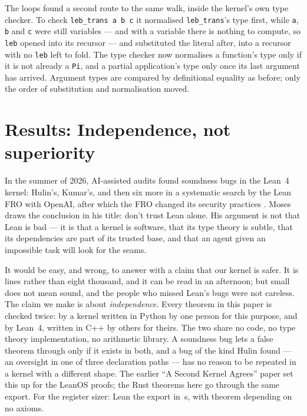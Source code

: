 \documentclass[11pt]{article}
\begin{document}
The loops found a second route to the same walk, inside the kernel's own
type checker.  To check \texttt{leb\_trans a b c} it normalised
\texttt{leb\_trans}'s type first, while \texttt{a}, \texttt{b} and
\texttt{c} were still variables --- and with a variable there is nothing to
compute, so \texttt{leb} opened into its recursor --- and substituted the
literal after, into a recursor with no \texttt{leb} left to fold.  The
type checker now normalises a function's type only if it is not already a
\texttt{Pi}, and a partial application's type only once its last argument
has arrived.  Argument types are compared by definitional equality as
before; only the order of substitution and normalisation moved.

\section{Results: Independence, not superiority}
\label{sec:two}

In the summer of 2026, AI-assisted audits found soundness bugs in the Lean~4
kernel: Hulin's, Kumar's, and then six more in a systematic search by the
Lean FRO with OpenAI, after which the FRO changed its security practices
\cite{moses2026,reddit2026}.  Moses draws the conclusion in his title:
don't trust Lean alone.  His argument is not that Lean is bad --- it is that
a kernel is software, that its type theory is subtle, that its dependencies
are part of its trusted base, and that an agent given an impossible task
will look for the seams.

It would be easy, and wrong, to answer with a claim that our kernel is safer.
It is  lines rather than eight thousand, and it can be read in
an afternoon; but small does not mean sound, and the people who missed Lean's
bugs were not careless.  The claim we make is about \emph{independence}.
Every theorem in this paper is checked twice: by a kernel written in Python
by one person for this purpose, and by Lean~4, written in C++ by others for
theirs.  The two share no code, no type theory implementation, no
arithmetic library.  A soundness bug lets a false theorem through only if it
exists in both, and a bug of the kind Hulin found --- an oversight in one
of three declaration paths --- has no reason to be repeated in a kernel
with a different shape.  The earlier ``A Second Kernel Agrees'' paper
\cite{hartshorn2026second} set this up for the LeanOS proofs; the Rust
theorems here go through the same export.  For the register sizer: Lean
\leanVersion{} \regsLeanVerdict{} the export in \regsLeanSeconds{}\,s, with
\regsLeanNoAxioms{} theorem depending on no axioms.
\end{document}

